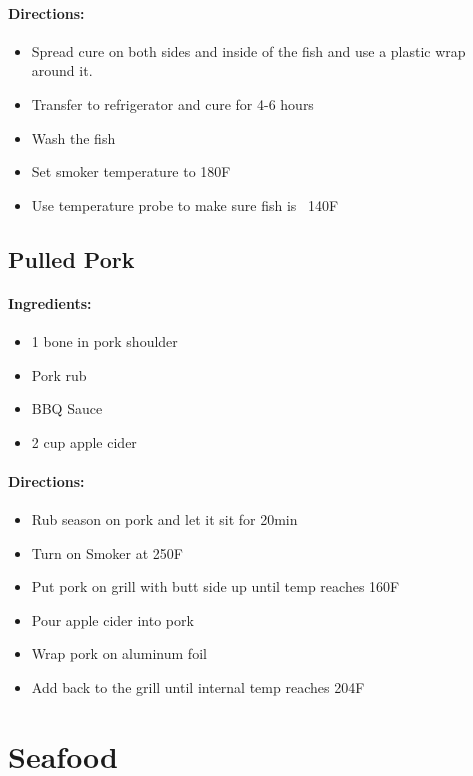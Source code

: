 \documentclass{article}
\begin{document}
\paragraph{Directions:}
\begin{itemize}
	\item Spread cure on both sides and inside of the fish and use a plastic wrap around it.
	\item Transfer to refrigerator and cure for 4-6 hours
	\item Wash the fish
	\item Set smoker temperature to 180F
	\item Use temperature probe to make sure fish is ~140F
\end{itemize}


\subsection{Pulled Pork}{}

\paragraph{Ingredients:}

\begin{itemize}
	\item 1 bone in pork shoulder
	\item Pork rub
	\item BBQ Sauce
	\item 2 cup apple cider
\end{itemize}

\paragraph{Directions:}
\begin{itemize}
	\item Rub season on pork and let it sit for 20min
	\item Turn on Smoker at 250F
	\item Put pork on grill with butt side up until temp reaches 160F
	\item Pour apple cider into pork
	\item Wrap pork on aluminum foil
	\item Add back to the grill until internal temp reaches 204F
\end{itemize}

\section{Seafood}
\end{document}
